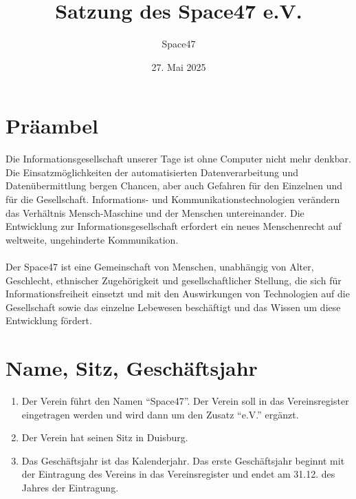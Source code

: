 \documentclass[a4paper]{article}
\title{Satzung des Space47 e.V.}
\author{Space47}
\date{27. Mai 2025}
\renewcommand\thesection{§ \arabic{section}}
\begin{document}
\maketitle


\renewcommand\thesection{}
\section{Präambel}

Die Informationsgesellschaft unserer Tage ist ohne Computer nicht mehr denkbar.
Die Einsatzmöglichkeiten der automatisierten Datenverarbeitung und Datenübermittlung bergen Chancen,
aber auch Gefahren für den Einzelnen und für die Gesellschaft.
Informations- und Kommunikationstechnologien verändern das Verhältnis Mensch-Maschine und der Menschen untereinander.
Die Entwicklung zur Informationsgesellschaft erfordert ein neues Menschenrecht auf weltweite, ungehinderte Kommunikation. \\ \\
Der Space47 ist eine Gemeinschaft von Menschen, unabhängig von Alter, Geschlecht, ethnischer Zugehörigkeit und
gesellschaftlicher Stellung, die sich für Informationsfreiheit einsetzt und mit den Auswirkungen von Technologien
auf die Gesellschaft sowie das einzelne Lebewesen beschäftigt und das Wissen um diese Entwicklung fördert.

\renewcommand\thesection{§ \arabic{section}}
\setcounter{section}{0}
\section{Name, Sitz, Geschäftsjahr}
\begin{enumerate}
	\item Der Verein führt den Namen \enquote{Space47}. Der Verein soll in das Vereinsregister eingetragen werden und wird dann um den Zusatz \enquote{e.V.} ergänzt.
	\item Der Verein hat seinen Sitz in Duisburg.
	\item Das Geschäftsjahr ist das Kalenderjahr. Das erste Geschäftsjahr beginnt mit der Eintragung des Vereins in das Vereinsregister und endet am 31.12. des Jahres der Eintragung.
\end{enumerate}
\end{document}
